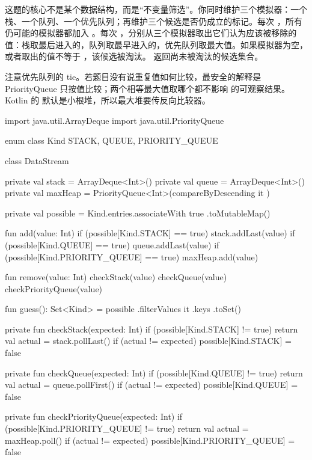 这题的核心不是某个数据结构，而是“不变量筛选”。你同时维护三个模拟器：一个栈、一个队列、一个优先队列；再维护三个候选是否仍成立的标记。每次 ，所有仍可能的模拟器都加入 。每次 ，分别从三个模拟器取出它们认为应该被移除的值：栈取最后进入的，队列取最早进入的，优先队列取最大值。如果模拟器为空，或者取出的值不等于 ，该候选被淘汰。 返回尚未被淘汰的候选集合。

注意优先队列的 tie。若题目没有说重复值如何比较，最安全的解释是 PriorityQueue 只按值比较；两个相等最大值取哪个都不影响  的可观察结果。Kotlin 的  默认是小根堆，所以最大堆要传反向比较器。

\begin{kotlin}
import java.util.ArrayDeque
import java.util.PriorityQueue

enum class Kind { STACK, QUEUE, PRIORITY_QUEUE }

class DataStream {
    private val stack = ArrayDeque<Int>()
    private val queue = ArrayDeque<Int>()
    private val maxHeap = PriorityQueue<Int>(compareByDescending { it })

    private val possible = Kind.entries.associateWith { true }.toMutableMap()

    fun add(value: Int) {
        if (possible[Kind.STACK] == true) stack.addLast(value)
        if (possible[Kind.QUEUE] == true) queue.addLast(value)
        if (possible[Kind.PRIORITY_QUEUE] == true) maxHeap.add(value)
    }

    fun remove(value: Int) {
        checkStack(value)
        checkQueue(value)
        checkPriorityQueue(value)
    }

    fun guess(): Set<Kind> = possible
        .filterValues { it }
        .keys
        .toSet()

    private fun checkStack(expected: Int) {
        if (possible[Kind.STACK] != true) return
        val actual = stack.pollLast()
        if (actual != expected) possible[Kind.STACK] = false
    }

    private fun checkQueue(expected: Int) {
        if (possible[Kind.QUEUE] != true) return
        val actual = queue.pollFirst()
        if (actual != expected) possible[Kind.QUEUE] = false
    }

    private fun checkPriorityQueue(expected: Int) {
        if (possible[Kind.PRIORITY_QUEUE] != true) return
        val actual = maxHeap.poll()
        if (actual != expected) possible[Kind.PRIORITY_QUEUE] = false
    }
}
\end{kotlin}

